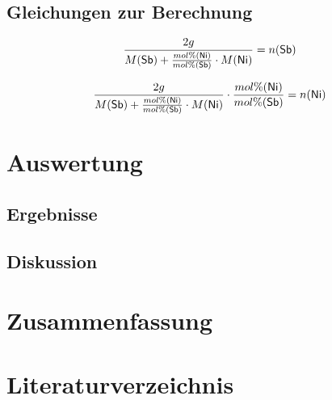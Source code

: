 \documentclass[12pt, a4paper]{article}
\begin{document}
\subsection{Gleichungen zur Berechnung}
\begin{equation}
  \frac{2 g}{M(\ce{Sb})+\frac{mol\%  (\ce{Ni})}{mol\%  (\ce{Sb})}\cdot M(\ce{Ni})}= n(\ce{Sb})
\end{equation}

\begin{equation}
  \frac{2 g}{M(\ce{Sb})+\frac{mol\%  (\ce{Ni})}{mol\%  (\ce{Sb})}\cdot M(\ce{Ni})}\cdot \frac{mol\%  (\ce{Ni})}{mol\%  (\ce{Sb})}= n(\ce{Ni})
\end{equation}



\newpage
\section{Auswertung}
\subsection{Ergebnisse}
\subsection{Diskussion}



\newpage
\section{Zusammenfassung}




\newpage
\section{Literaturverzeichnis}
\printbibliography
\end{document}
